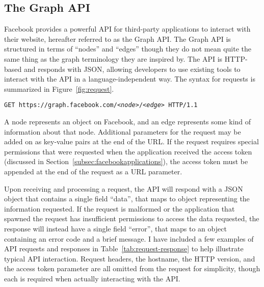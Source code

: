 \documentclass[11pt,twocolumn]{article}
\begin{document}
\subsection{The Graph API}
\label{subsec:thegraphapi}

Facebook provides a powerful API for third-party applications to interact with
their website, hereafter referred to as the Graph API\cite{graphapi}. The Graph
API is structured in terms of ``nodes'' and ``edges'' though they do not mean
quite the same thing as the graph terminology they are inspired by. The API is
HTTP-based and responds with JSON, allowing developers to use existing tools to
interact with the API in a language-independent way. The syntax for requests
is summarized in Figure~\ref{fig:request}.

\begin{figure*}
\caption{Graph API Request Syntax}
\begin{center}
    \texttt{GET https://graph.facebook.com/<\textit{node}>/<\textit{edge}> HTTP/1.1}
\end{center}
\label{fig:request}
\end{figure*}

A node represents an object on Facebook, and an edge represents some kind of
information about that node. Additional parameters for the request may be added
on as key-value pairs at the end of the URL\@. If the request requires special
permissions that were requested when the application received the access token
(discussed in Section~\ref{subsec:facebookapplications}), the access token must
be appended at the end of the request as a URL parameter.

Upon receiving and processing a request, the API will respond with a JSON
object that contains a single field ``data'', that maps to object representing
the information requested. If the request is malformed or the application that
spawned the request has insufficient permissions to access the data requested,
the response will instead have a single field ``error'', that maps to an
object containing an error code and a brief message. I have included a few
examples of API requests and responses in Table~\ref{tab:request-response} to
help illustrate typical API interaction. Request headers, the hostname, the
HTTP version, and the access token parameter are all omitted from the request
for simplicity, though each is required when actually interacting with the
API\@.
\end{document}
